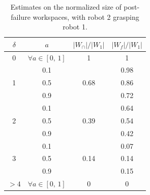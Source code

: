 \documentclass[12pt]{report}
\begin{document}


\begin{table}[t]
\begin{center}
\caption{{\small Estimates on the normalized size of post-failure workspaces, with robot 2 grasping robot 1.}}
\begin{tabular}{|c|c|c|c|}
\hline 
$\delta$ & $a$ & $|W_\cap| / |W_1|$ & $|W_f|/|W_1|$ \\ \hline
0     & $\forall a \in [0 , \, 1]$ & 1 & 1 \\ \hline
 			& 0.1 & 			& 0.98\\
1 		& 0.5 & 0.68 	& 0.86\\
 			& 0.9 & 			& 0.72\\ \hline
 			& 0.1 & 			& 0.64\\
2 		& 0.5 & 0.39 	& 0.54\\
 			& 0.9 & 			& 0.42\\ \hline
 			& 0.1 & 			& 0.07\\
3 		& 0.5 & 0.14	& 0.14\\
 			& 0.9 & 			& 0.15\\ \hline
$>4$  & $\forall a \in [0 , \, 1]$ & 0  & 0 \\ \hline
\end{tabular}
\end{center}
\label{tab:w_f}
\end{table}
\end{document}
